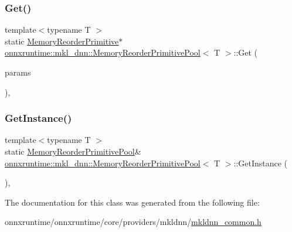 \subsubsection{\texorpdfstring{Get()}{Get()}}
{\footnotesize\ttfamily template$<$typename T $>$ \\
static \mbox{\hyperlink{classonnxruntime_1_1mkl__dnn_1_1MemoryReorderPrimitive}{Memory\+Reorder\+Primitive}}$\ast$ \mbox{\hyperlink{classonnxruntime_1_1mkl__dnn_1_1MemoryReorderPrimitivePool}{onnxruntime\+::mkl\+\_\+dnn\+::\+Memory\+Reorder\+Primitive\+Pool}}$<$ T $>$\+::Get (\begin{DoxyParamCaption}\item[{const \mbox{\hyperlink{structonnxruntime_1_1mkl__dnn_1_1MemoryReorderParams}{Memory\+Reorder\+Params}} \&}]{params }\end{DoxyParamCaption})\hspace{0.3cm}{\ttfamily [inline]}, {\ttfamily [static]}}

\mbox{\label{classonnxruntime_1_1mkl__dnn_1_1MemoryReorderPrimitivePool_a41a9e35c7e1afee6815409098f485e62}} 
\subsubsection{\texorpdfstring{Get\+Instance()}{GetInstance()}}
{\footnotesize\ttfamily template$<$typename T $>$ \\
static \mbox{\hyperlink{classonnxruntime_1_1mkl__dnn_1_1MemoryReorderPrimitivePool}{Memory\+Reorder\+Primitive\+Pool}}\& \mbox{\hyperlink{classonnxruntime_1_1mkl__dnn_1_1MemoryReorderPrimitivePool}{onnxruntime\+::mkl\+\_\+dnn\+::\+Memory\+Reorder\+Primitive\+Pool}}$<$ T $>$\+::Get\+Instance (\begin{DoxyParamCaption}{ }\end{DoxyParamCaption})\hspace{0.3cm}{\ttfamily [inline]}, {\ttfamily [static]}}



The documentation for this class was generated from the following file\+:\begin{DoxyCompactItemize}
\item 
onnxruntime/onnxruntime/core/providers/mkldnn/\mbox{\hyperlink{mkldnn__common_8h}{mkldnn\+\_\+common.\+h}}\end{DoxyCompactItemize}
